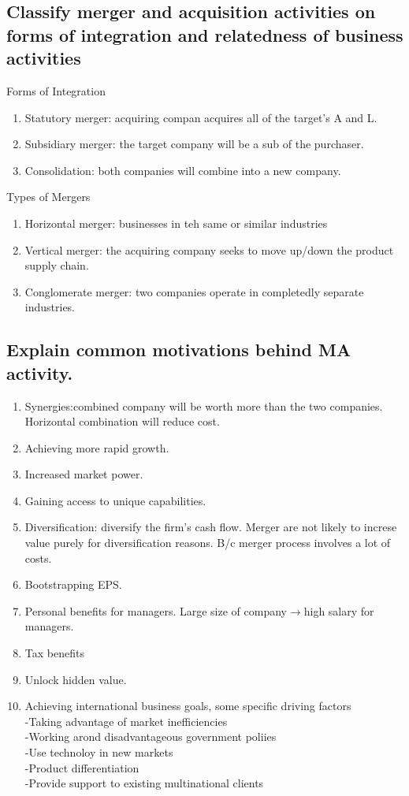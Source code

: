 \documentclass{article}
\newcommand{\be}{\begin{enumerate}}
\newcommand{\ee}{\end{enumerate}}
\newcommand{\ra}{$\rightarrow$}
\begin{document}
\subsection{Classify merger and acquisition activities on forms of integration
and relatedness of business activities}
Forms of Integration
\be
    \item Statutory merger: acquiring compan acquires all of the target's A and L.
    \item Subsidiary merger: the target company will be a sub of the purchaser.
    \item Consolidation: both companies will combine into a new company.
\ee
Types of Mergers
\be
    \item Horizontal merger: businesses in teh same or similar industries
    \item Vertical merger: the acquiring company seeks to move up/down the product
        supply chain.
    \item Conglomerate merger: two companies operate in completedly separate
        industries.
\ee
\subsection{Explain common motivations behind MA activity.}
\be
    \item Synergies:combined company will be worth more than the two companies.
        Horizontal combination will reduce cost.
    \item Achieving more rapid growth. 
    \item Increased market power.
    \item Gaining access to unique capabilities.
    \item Diversification: diversify the firm's cash flow. Merger are not likely to increse
        value purely for diversification reasons. B/c merger process involves a lot
        of costs.
    \item Bootstrapping EPS. 
    \item Personal benefits for managers. Large size of company\ra high salary for managers.
    \item Tax benefits
    \item Unlock hidden value.
    \item Achieving international business goals, some specific driving factors
        \\-Taking advantage of market inefficiencies
        \\-Working arond disadvantageous government poliies
        \\-Use technoloy in new markets
        \\-Product differentiation
        \\-Provide support to existing multinational clients
\ee
\end{document}
